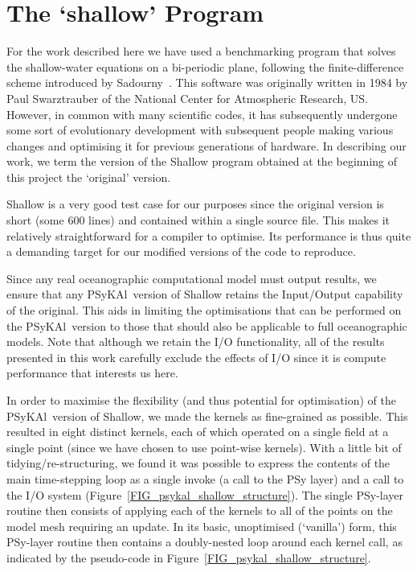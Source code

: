 \documentclass{IOS-Book-Article}
\newcommand{\psykal}{{PS}y{KA}l\ }
\begin{document}
\section{The `shallow' Program}

For the work described here we have used a benchmarking program that
solves the shallow-water equations on a bi-periodic plane, following
the finite-difference scheme introduced by Sadourny~\cite{sadourny75}.
This software was originally written in 1984 by Paul Swarztrauber of
the National Center for Atmospheric Research, US.  However, in common
with many scientific codes, it has subsequently undergone some sort of
evolutionary development with subsequent people making various changes
and optimising it for previous generations of hardware.  In describing
our work, we term the version of the Shallow program obtained at the
beginning of this project the `original' version.

Shallow is a very good test case for our purposes since the original
version is short (some 600 lines) and contained within a single source
file. This makes it relatively straightforward for a compiler to
optimise. Its performance is thus quite a demanding target for our
modified versions of the code to reproduce.

Since any real oceanographic computational model must output results,
we ensure that any \psykal version of Shallow retains the Input/Output
capability of the original. This aids in limiting the optimisations
that can be performed on the \psykal version to those that should also
be applicable to full oceanographic models. Note that although we
retain the I/O functionality, all of the results presented in this work
carefully exclude the effects of I/O since it is compute performance
that interests us here.

In order to maximise the flexibility (and thus potential for
optimisation) of the \psykal version of Shallow, we made the kernels
as fine-grained as possible. This resulted in eight
distinct kernels, each of which operated on a single field at a single
point (since we have chosen to use point-wise kernels). With a little
bit of tidying/re-structuring, we found it was possible to express the
contents of the main time-stepping loop as a single invoke (a call to
the PSy layer) and a call to the I/O system
(Figure~\ref{FIG_psykal_shallow_structure}). The single PSy-layer
routine then consists of applying each of the kernels to all of the
points on the model mesh requiring an update. In its basic,
unoptimised (`vanilla') form, this PSy-layer routine then contains a
doubly-nested loop around each kernel call, as indicated by the
pseudo-code in Figure~\ref{FIG_psykal_shallow_structure}.
\end{document}
